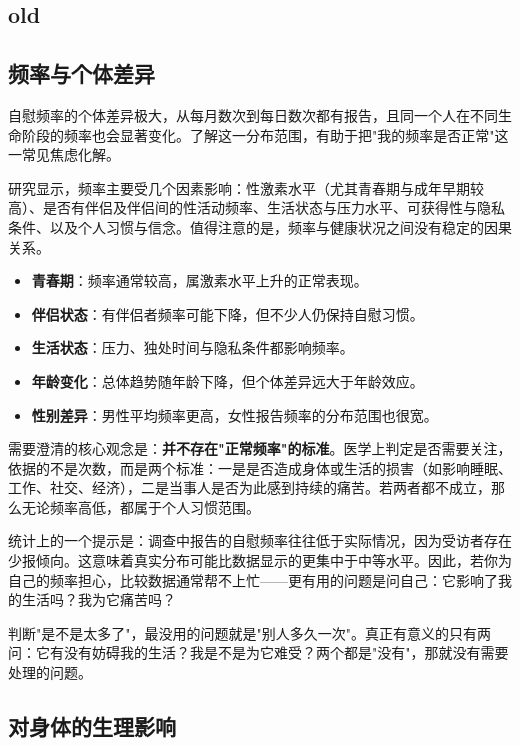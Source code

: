 \documentclass[12pt,UTF8]{ctexbook}
\newcommand{\keyword}[1]{\textbf{#1}}
\begin{document}
\subsection{old}

\subsection{频率与个体差异}

自慰频率的个体差异极大，从每月数次到每日数次都有报告，且同一个人在不同生命阶段的频率也会显著变化。了解这一分布范围，有助于把"我的频率是否正常"这一常见焦虑化解。

研究显示，频率主要受几个因素影响：性激素水平（尤其青春期与成年早期较高）、是否有伴侣及伴侣间的性活动频率、生活状态与压力水平、可获得性与隐私条件、以及个人习惯与信念。值得注意的是，频率与健康状况之间没有稳定的因果关系。

\begin{itemize}
	\item \keyword{青春期}：频率通常较高，属激素水平上升的正常表现。
	\item \keyword{伴侣状态}：有伴侣者频率可能下降，但不少人仍保持自慰习惯。
	\item \keyword{生活状态}：压力、独处时间与隐私条件都影响频率。
	\item \keyword{年龄变化}：总体趋势随年龄下降，但个体差异远大于年龄效应。
	\item \keyword{性别差异}：男性平均频率更高，女性报告频率的分布范围也很宽。
\end{itemize}

需要澄清的核心观念是：\keyword{并不存在"正常频率"的标准}。医学上判定是否需要关注，依据的不是次数，而是两个标准：一是是否造成身体或生活的损害（如影响睡眠、工作、社交、经济），二是当事人是否为此感到持续的痛苦。若两者都不成立，那么无论频率高低，都属于个人习惯范围。

统计上的一个提示是：调查中报告的自慰频率往往低于实际情况，因为受访者存在少报倾向。这意味着真实分布可能比数据显示的更集中于中等水平。因此，若你为自己的频率担心，比较数据通常帮不上忙——更有用的问题是问自己：它影响了我的生活吗？我为它痛苦吗？

\begin{tcolorbox}[colback=pink!5!white,colframe=red!50!black,title=贴心小叮咛]
	判断"是不是太多了"，最没用的问题就是"别人多久一次"。真正有意义的只有两问：它有没有妨碍我的生活？我是不是为它难受？两个都是"没有"，那就没有需要处理的问题。
\end{tcolorbox}
\subsection{对身体的生理影响}
\end{document}
